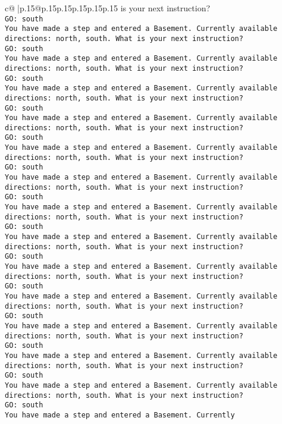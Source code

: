 \documentclass{article}
\begin{document}
{\begin{supertabular}{c@{$\;$}|p{.15\linewidth}@{}p{.15\linewidth}p{.15\linewidth}p{.15\linewidth}p{.15\linewidth}p{.15\linewidth}}
{{{is your next instruction?\\ \tt GO: south\\ \tt You have made a step and entered a Basement. Currently available directions: north, south. What is your next instruction?\\ \tt GO: south\\ \tt You have made a step and entered a Basement. Currently available directions: north, south. What is your next instruction?\\ \tt GO: south\\ \tt You have made a step and entered a Basement. Currently available directions: north, south. What is your next instruction?\\ \tt GO: south\\ \tt You have made a step and entered a Basement. Currently available directions: north, south. What is your next instruction?\\ \tt GO: south\\ \tt You have made a step and entered a Basement. Currently available directions: north, south. What is your next instruction?\\ \tt GO: south\\ \tt You have made a step and entered a Basement. Currently available directions: north, south. What is your next instruction?\\ \tt GO: south\\ \tt You have made a step and entered a Basement. Currently available directions: north, south. What is your next instruction?\\ \tt GO: south\\ \tt You have made a step and entered a Basement. Currently available directions: north, south. What is your next instruction?\\ \tt GO: south\\ \tt You have made a step and entered a Basement. Currently available directions: north, south. What is your next instruction?\\ \tt GO: south\\ \tt You have made a step and entered a Basement. Currently available directions: north, south. What is your next instruction?\\ \tt GO: south\\ \tt You have made a step and entered a Basement. Currently available directions: north, south. What is your next instruction?\\ \tt GO: south\\ \tt You have made a step and entered a Basement. Currently available directions: north, south. What is your next instruction?\\ \tt GO: south\\ \tt You have made a step and entered a Basement. Currently available directions: north, south. What is your next instruction?\\ \tt GO: south\\ \tt You have made a step and entered a Basement. Currently }}}
\end{supertabular}}
\end{document}
